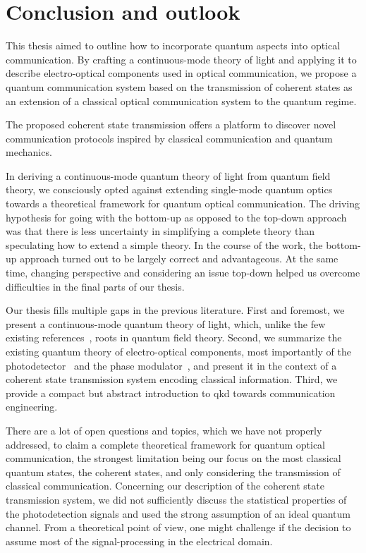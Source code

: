 \chapter*{Conclusion and outlook}

This thesis aimed to outline how to incorporate quantum aspects into optical communication.
By crafting a continuous-mode theory of light and applying it to describe electro-optical components used in optical communication, we propose a quantum communication system based on the transmission of coherent states as an extension of a classical optical communication system to the quantum regime.

The proposed coherent state transmission offers a platform to discover novel communication protocols inspired by classical communication and quantum mechanics.

In deriving a continuous-mode quantum theory of light from quantum field theory, we consciously opted against extending single-mode quantum optics towards a theoretical framework for quantum optical communication.
The driving hypothesis for going with the bottom-up as opposed to the top-down approach was that there is less uncertainty in simplifying a complete theory than speculating how to extend a simple theory.
In the course of the work, the bottom-up approach turned out to be largely correct and advantageous.
At the same time, changing perspective and considering an issue top-down helped us overcome difficulties in the final parts of our thesis.

Our thesis fills multiple gaps in the previous literature.
First and foremost, we present a continuous-mode quantum theory of light, which, unlike the few existing references~\cite{Barnett2002,Loudon2000}, roots in quantum field theory.
Second, we summarize the existing quantum theory of electro-optical components, most importantly of the photodetector~\cite{Vogel2006,Mandel1995,Shapiro2009} and the phase modulator~\cite{Horoshko2018}, and present it in the context of a coherent state transmission system encoding classical information.
Third, we provide a compact but abstract introduction to \gls{qkd} towards communication engineering.

There are a lot of open questions and topics, which we have not properly addressed, to claim a complete theoretical framework for quantum optical communication, the strongest limitation being our focus on the most classical quantum states, the coherent states, and only considering the transmission of classical communication.
Concerning our description of the coherent state transmission system, we did not sufficiently discuss the statistical properties of the photodetection signals and used the strong assumption of an ideal quantum channel.
From a theoretical point of view, one might challenge if the decision to assume most of the signal-processing in the electrical domain.


